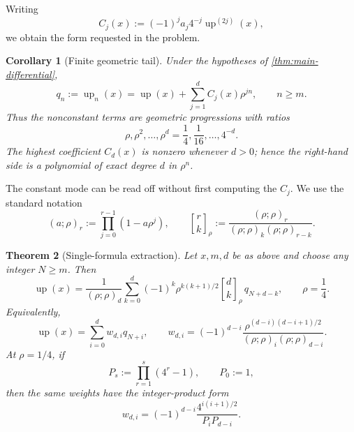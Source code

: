 \documentclass[11pt,oneside]{article}
\newtheorem{theorem}{Theorem}[section]
\newtheorem{corollary}[theorem]{Corollary}
\theoremstyle{definition}
\theoremstyle{remark}
\newcommand{\up}{\operatorname{up}}
\newcommand{\qbinom}[3]{\genfrac{[}{]}{0pt}{}{#1}{#2}_{#3}}
\begin{document}
Writing
\begin{equation}\label{eq:Cj-def}
 C_j(x):=(-1)^j a_j4^{-j}\up^{(2j)}(x),
\end{equation}
we obtain the form requested in the problem.

\begin{corollary}[Finite geometric tail]\label{cor:geometric-tail}
Under the hypotheses of \cref{thm:main-differential},
\begin{equation}\label{eq:geometric-tail}
 \boxed{\displaystyle
 q_n:=\up_n(x)=\up(x)+\sum_{j=1}^{d}C_j(x)\rho^{jn},
 \qquad n\ge m.}
\end{equation}
Thus the nonconstant terms are geometric progressions with ratios
\[
 \rho,\rho^2,\ldots,\rho^d
 =\frac14,\frac1{16},\ldots,4^{-d}.
\]
The highest coefficient \(C_d(x)\) is nonzero whenever \(d>0\); hence the
right-hand side is a polynomial of exact degree \(d\) in \(\rho^n\).
\end{corollary}

The constant mode can be read off without first computing the \(C_j\).
We use the standard notation
\begin{equation}\label{eq:q-notation-intro}
 (a;\rho)_r:=\prod_{j=0}^{r-1}(1-a\rho^j),
 \qquad
 \qbinom{r}{k}{\rho}:=
 \frac{(\rho;\rho)_r}{(\rho;\rho)_k(\rho;\rho)_{r-k}}.
\end{equation}

\begin{theorem}[Single-formula extraction]\label{thm:single-extraction}
Let \(x,m,d\) be as above and choose any integer \(N\ge m\).  Then
\begin{equation}\label{eq:single-extraction}
 \boxed{\displaystyle
 \up(x)=\frac{1}{(\rho;\rho)_d}
 \sum_{k=0}^{d}(-1)^k\rho^{k(k+1)/2}
 \qbinom{d}{k}{\rho}\,q_{N+d-k},
 \qquad \rho=\frac14.}
\end{equation}
Equivalently,
\begin{equation}\label{eq:forward-extraction}
 \up(x)=\sum_{i=0}^{d}w_{d,i}q_{N+i},
 \qquad
 w_{d,i}=(-1)^{d-i}
 \frac{\rho^{(d-i)(d-i+1)/2}}
 {(\rho;\rho)_i(\rho;\rho)_{d-i}}.
\end{equation}
At \(\rho=1/4\), if
\begin{equation}\label{eq:Ps-def}
 P_s:=\prod_{r=1}^{s}(4^r-1),\qquad P_0:=1,
\end{equation}
then the same weights have the integer-product form
\begin{equation}\label{eq:integer-weight}
 \boxed{\displaystyle
 w_{d,i}=(-1)^{d-i}\frac{4^{i(i+1)/2}}{P_iP_{d-i}}.}
\end{equation}
\end{theorem}
\end{document}
